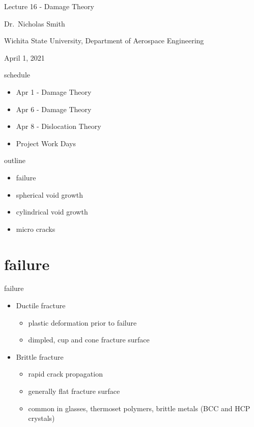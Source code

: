 \documentclass[
  letterpaper,
  ignorenonframetext,
  aspectratio=43,
  handout,
  12pt]{beamer}
\author{}
\date{}
\providecommand{\tightlist}{%
  \setlength{\itemsep}{0pt}\setlength{\parskip}{0pt}}
\providecommand{\tightlist}{%
\setlength{\itemsep}{0pt}\setlength{\parskip}{0pt}}
\begin{document}
\begin{frame}
Lecture 16 - Damage Theory

Dr.~Nicholas Smith

Wichita State University, Department of Aerospace Engineering

April 1, 2021
\end{frame}

\begin{frame}{schedule}
\protect\hypertarget{schedule}{}
\begin{itemize}
\tightlist
\item
  Apr 1 - Damage Theory
\item
  Apr 6 - Damage Theory
\item
  Apr 8 - Dislocation Theory
\item
  Project Work Days
\end{itemize}
\end{frame}

\begin{frame}{outline}
\protect\hypertarget{outline}{}
\begin{itemize}
\tightlist
\item
  failure
\item
  spherical void growth
\item
  cylindrical void growth
\item
  micro cracks
\end{itemize}
\end{frame}

\hypertarget{failure}{%
\section{failure}\label{failure}}

\begin{frame}{failure}
\protect\hypertarget{failure-1}{}
\begin{itemize}
\tightlist
\item
  Ductile fracture

  \begin{itemize}
  \tightlist
  \item
    plastic deformation prior to failure
  \item
    dimpled, cup and cone fracture surface
  \end{itemize}
\item
  Brittle fracture

  \begin{itemize}
  \tightlist
  \item
    rapid crack propagation
  \item
    generally flat fracture surface
  \item
    common in glasses, thermoset polymers, brittle metals (BCC and HCP
    crystals)
  \end{itemize}
\end{itemize}
\end{frame}
\end{document}
